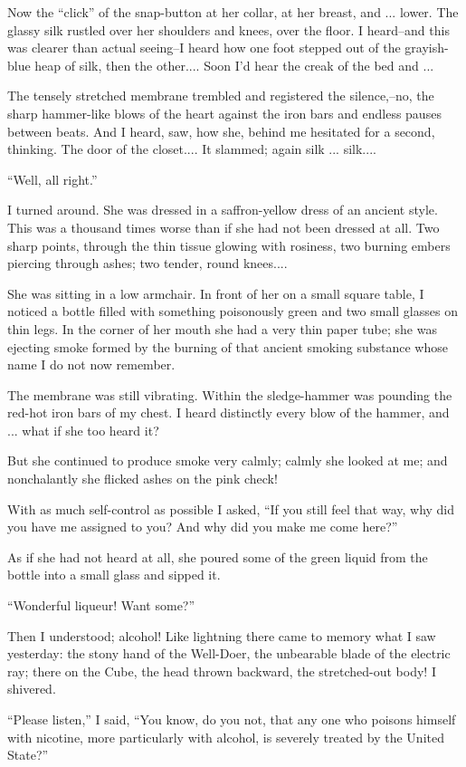 \documentclass[11pt,openany]{book}
\begin{document}
Now the ``click'' of the snap-button at her collar, at her breast, and ... lower. The glassy silk rustled over her shoulders and knees, over the floor. I heard--and this was clearer than actual seeing--I heard how one foot stepped out of the grayish-blue heap of silk, then the other.... Soon I'd hear the creak of the bed and ...

The tensely stretched membrane trembled and registered the silence,--no, the sharp hammer-like blows of the heart against the iron bars and endless pauses between beats. And I heard, saw, how she, behind me hesitated for a second, thinking. The door of the closet.... It slammed; again silk ... silk....

``Well, all right.''

I turned around. She was dressed in a saffron-yellow dress of an ancient style. This was a thousand times worse than if she had not been dressed at all. Two sharp points, through the thin tissue glowing with rosiness, two burning embers piercing through ashes; two tender, round knees....

She was sitting in a low armchair. In front of her on a small square table, I noticed a bottle filled with something poisonously green and two small glasses on thin legs. In the corner of her mouth she had a very thin paper tube; she was ejecting smoke formed by the burning of that ancient smoking substance whose name I do not now remember.

The membrane was still vibrating. Within the sledge-hammer was pounding the red-hot iron bars of my chest. I heard distinctly every blow of the hammer, and ... what if she too heard it?

But she continued to produce smoke very calmly; calmly she looked at me; and nonchalantly she flicked ashes on the pink check!

With as much self-control as possible I asked, ``If you still feel that way, why did you have me assigned to you? And why did you make me come here?''

As if she had not heard at all, she poured some of the green liquid from the bottle into a small glass and sipped it.

``Wonderful liqueur! Want some?''

Then I understood; alcohol! Like lightning there came to memory what I saw yesterday: the stony hand of the Well-Doer, the unbearable blade of the electric ray; there on the Cube, the head thrown backward, the stretched-out body! I shivered.

``Please listen,'' I said, ``You know, do you not, that any one who poisons himself with nicotine, more particularly with alcohol, is severely treated by the United State?''
\end{document}
